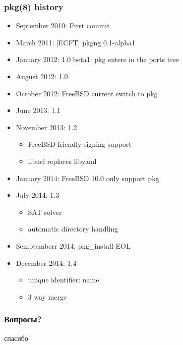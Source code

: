 \begin{frame}
	\frametitle{pkg(8) history}
	\begin{itemize}
		\item September 2010: First commit
		\item March 2011:  [ECFT] pkgng 0.1-alpha1
		\item January 2012: 1.0 beta1: pkg enters in the ports tree
		\item August 2012: 1.0
		\item October 2012: FreeBSD current switch to pkg
		\item June 2013: 1.1
		\item November 2013: 1.2
			\begin{itemize}
				\item FreeBSD friendly signing support
				\item libucl replaces libyaml
			\end{itemize}
		\item January 2014: FreeBSD 10.0 only support pkg
		\item July 2014: 1.3
			\begin{itemize}
				\item SAT solver
				\item automatic directory handling
			\end{itemize}
		\item Semptemberr 2014: pkg\_install EOL
		\item December 2014: 1.4
			\begin{itemize}
				\item unique identifier: name
				\item 3 way merge
			\end{itemize}
	\end{itemize}
\end{frame}

\begin{frame}[plain]
	\frametitle{Вопросы?}
	\begin{center}
		\Huge спасибо
	\end{center}
\end{frame}


